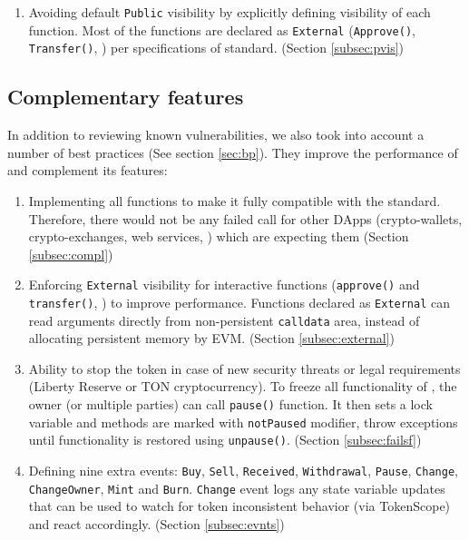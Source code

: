 {\begin{enumerate}[noitemsep,topsep=0pt]
	\item Avoiding default \texttt{Public} visibility by explicitly defining visibility of each function. Most of the functions are declared as \texttt{External} (\eg \texttt{Approve()}, \texttt{Transfer()}, \etc) per specifications of \erc standard. (\cf Section \ref{subsec:pvis})
\end{enumerate}

\subsection{Complementary features}
In addition to reviewing known vulnerabilities, we also took into account a number of best practices (See section \ref{sec:bp}). They improve the performance of \sys and complement its features:
\begin{enumerate}[noitemsep,topsep=0pt]
	\item Implementing all functions to make it fully compatible with the \erc standard. Therefore, there would not be any failed call for other DApps (\ie crypto-wallets, crypto-exchanges, web services, \etc) which are expecting them (Section \ref{subsec:compl})

	\item Enforcing \texttt{External} visibility for interactive functions (\eg \texttt{approve()} and \texttt{transfer()}, \etc) to improve performance. Functions declared as \texttt{External} can read arguments directly from non-persistent \texttt{calldata} area, instead of allocating persistent memory by EVM. (Section \ref{subsec:external})

	\item Ability to stop the token in case of new security threats or legal requirements (\eg Liberty Reserve \cite{LibertyReserve} or TON cryptocurrency\cite{TON}). To freeze all functionality of \sys, the owner (or multiple parties) can call \texttt{pause()} function. It then sets a lock variable and methods are marked with \texttt{notPaused} modifier, throw exceptions until functionality is restored using \texttt{unpause()}. (Section \ref{subsec:failsf})

	\item Defining nine extra events: \texttt{Buy}, \texttt{Sell}, \texttt{Received}, \texttt{Withdrawal}, \texttt{Pause}, \texttt{Change}, \texttt{ChangeOwner}, \texttt{Mint} and \texttt{Burn}. \texttt{Change} event logs any state variable updates that can be used to watch for token inconsistent behavior (\eg via TokenScope\cite{TokenScope}) and react accordingly. (Section \ref{subsec:evnts})
	

\end{enumerate}}
